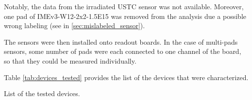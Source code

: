 Notably, the data from the irradiated USTC sensor was not available. Moreover, one pad of IMEv3-W12-2x2-1.5E15 was removed from the analysis due a possible wrong labeling (see in \ref{sec:mislabeled_sensor}).

The sensors were then installed onto readout boards. In the case of multi-pads sensors, some number of pads were each connected to one channel of the board, so that they could be measured individually.

Table \ref{tab:devices_tested} provides the list of the devices that were characterized.


\begin{table}[h!tbp]  
    \centering
    \captionsetup{width=\captionwidth}
    \caption{List of the tested devices.}
    \label{tab:devices_tested}


\end{table}
